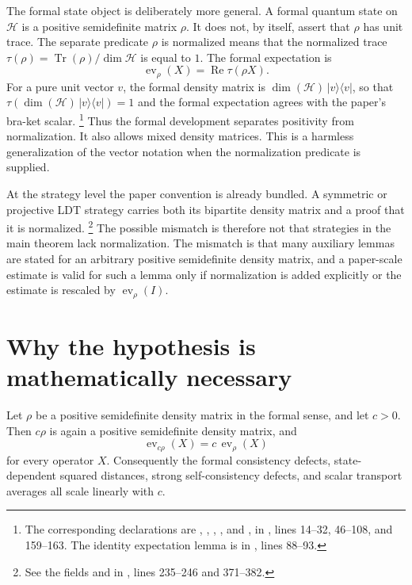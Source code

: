 \documentclass[11pt]{article}
\newcommand{\calH}{\mathcal H}
\newcommand{\ev}{\operatorname{ev}}
\begin{document}
The formal state object is deliberately more general. A formal quantum state on
$\calH$ is a positive semidefinite matrix $\rho$. It does not, by itself,
assert that $\rho$ has unit trace. The separate predicate
$\rho$ is normalized means that the normalized trace
$\tau(\rho)=\operatorname{Tr}(\rho)/\dim\calH$ is equal to $1$. The formal
expectation is
\[
  \ev_\rho(X)=\operatorname{Re} \tau(\rho X).
\]
For a pure unit vector $v$, the formal density matrix is
$\dim(\calH)\,|v\rangle\langle v|$, so that
$\tau(\dim(\calH)\,|v\rangle\langle v|)=1$ and the formal expectation agrees
with the paper's bra-ket scalar.
\footnote{The corresponding declarations are ,
, ,
, and , in
, lines 14--32, 46--108, and
159--163. The identity expectation lemma is
 in
, lines 88--93.}
Thus the formal development separates positivity from normalization. It also
allows mixed density matrices. This is a harmless generalization of the vector
notation when the normalization predicate is supplied.

At the strategy level the paper convention is already bundled. A symmetric or
projective LDT strategy carries both its bipartite density matrix and a proof
that it is normalized.
\footnote{See the fields  and
 in ,
lines 235--246 and 371--382.}
The possible mismatch is therefore not that strategies in the main theorem lack
normalization. The mismatch is that many auxiliary lemmas are stated for an
arbitrary positive semidefinite density matrix, and a paper-scale estimate is
valid for such a lemma only if normalization is added explicitly or the estimate
is rescaled by $\ev_\rho(I)$.

\section{Why the hypothesis is mathematically necessary}

Let $\rho$ be a positive semidefinite density matrix in the formal sense, and
let $c>0$. Then $c\rho$ is again a positive semidefinite density matrix, and
\[
  \ev_{c\rho}(X)=c\,\ev_\rho(X)
\]
for every operator $X$. Consequently the formal consistency defects,
state-dependent squared distances, strong self-consistency defects, and scalar
transport averages all scale linearly with $c$.
\end{document}
